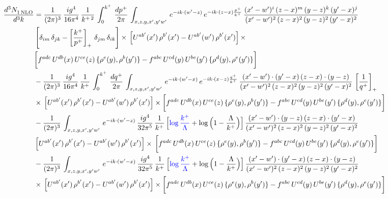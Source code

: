 \documentclass[9pt]{article}
\numberwithin{equation}{section}
\begin{document}
\begin{align}
     \frac{d^{3}N_{1\,\rm NLO}^{\rm}}{d^{3}k}  & = \frac{1}{(2\pi)^{3}}\, \frac{ig^{4}}{16\pi^{4}}\, \frac{1}{k^{+\,2}}\,\int_{0}^{k^{+}}\, \frac{dp^{+}}{2\pi}\,\int_{x,z,y,x',y'w'}\,e^{-ik\cdot (w^\prime-z)}\,e^{-ik\cdot (z-x)\frac{p^{+}}{k^{+}}}\,\frac{(x'-w')^{i}\,(z-x)^{m}\,(y-z)^{k}\,(y'-x)^{j}}{(x'-w')^{2}\,(z-x)^{2}\,(y-z)^{2}\,(y'-x)^{2}}\,\notag \\ & \left[\delta_{im}\,\delta_{jk}-\left[\frac{k^{+}}{p^{+}}\right]_{+}\, \delta_{jm}\,\delta_{ik}\right]\times\, \left[U^{ab'}(x')\,\rho^{b'}(x')-U^{ab'}(w')\,\rho^{b'}(x')\right]\times\notag \\ & \bigg[f^{adc}\,U^{db}(x)\,U^{ce}(z)\, \{\rho^{e}(y),\rho^{b}(y')\}-f^{abc}\,U^{cd}(y)\,U^{be}(y')\, \{\rho^{d}(y),\rho^{e}(y')\}\bigg]\notag \\ & -\frac{1}{(2\pi)^{3}}\, \frac{ig^{4}}{16\pi^{4}}\, \frac{1}{k^{+}}\,\int_{0}^{k^{+}}\, \frac{dq^{+}}{2\pi}\,\int_{x,z,y,x',y'w'}\,e^{-ik\cdot (w^\prime-x)}\,e^{-ik\cdot (x-z)\frac{q^{+}}{k^{+}}}\,\frac{(x'-w')\cdot (y'-x)\,(z-x)\cdot (y-z)}{(x'-w')^{2}\,(z-x)^{2}\,(y-z)^{2}\,(y'-x)^{2}}\,\left[\frac{1}{q^{+}}\right]_{+}\notag \\ & \times\, \left[U^{ab'}(x')\,\rho^{b'}(x')-U^{ab'}(w')\,\rho^{b'}(x')\right]\times \bigg[f^{adc}\,U^{db}(x)\,U^{ce}(z)\, \{\rho^{e}(y),\rho^{b}(y')\}-f^{abc}\,U^{cd}(y)\,U^{be}(y')\, \{\rho^{d}(y),\rho^{e}(y')\}\bigg]\notag \\ & -\frac{1}{(2\pi)^{3}}\, \int_{x,z,y,x',y'w'}\,e^{-ik\cdot (w^\prime-z)}\,\frac{ig^{4}}{32\pi^{5}}\, \frac{1}{k^{+}}\,\Big[{\color{blue}\log\frac{k^{+}}{\Lambda}}+\log\Big(1-\frac{\Lambda}{k^{+}}\Big)\Big]\,\frac{(x'-w')\cdot (y-z)\,(z-x)\cdot (y'-x)}{(x'-w')^{2}\,(z-x)^{2}\,(y-z)^{2}\,(y'-x)^{2}}\,\notag \\ & \left[U^{ab'}(x')\,\rho^{b'}(x')-U^{ab'}(w')\,\rho^{b'}(x')\right]\times\, \bigg[f^{adc}\,U^{db}(x)\,U^{ce}(z)\, \{\rho^{e}(y),\rho^{b}(y')\}-f^{abc}\,U^{cd}(y)\,U^{be}(y')\, \{\rho^{d}(y),\rho^{e}(y')\}\bigg]\notag \\ &  -\frac{1}{(2\pi)^{3}}\, \int_{x,z,y,x',y'w'}\,e^{-ik\cdot (w^\prime-x)}\,\frac{ig^{4}}{32\pi^{5}}\, \frac{1}{k^{+}}\,\Big[{\color{blue}\log\frac{k^{+}}{\Lambda}}+\log\Big(1-\frac{\Lambda}{k^{+}}\Big)\Big]\,\frac{(x'-w')\cdot (y'-x)\,(z-x)\cdot (y-z)}{(x'-w')^{2}\,(z-x)^{2}\,(y-z)^{2}\,(y'-x)^{2}}\notag \\ & \times\, \left[U^{ab'}(x')\,\rho^{b'}(x')-U^{ab'}(w')\,\rho^{b'}(x')\right]\times \bigg[f^{adc}\,U^{db}(x)\,U^{ce}(z)\, \{\rho^{e}(y),\rho^{b}(y')\}-f^{abc}\,U^{cd}(y)\,U^{be}(y')\, \{\rho^{d}(y),\rho^{e}(y')\}\bigg]
\end{align}
\end{document}
